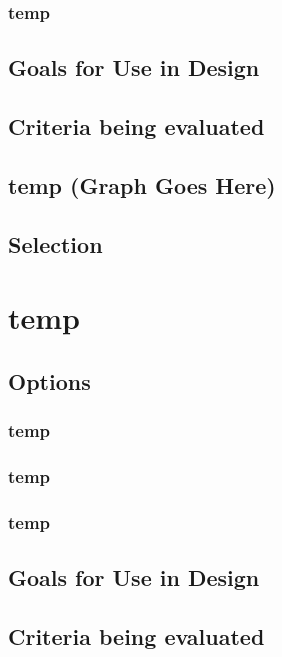 \documentclass[10pt,letterpaper,onecolumn,journal]{IEEEtran}
\begin{document}
\subsubsection{temp}

\subsection{Goals for Use in Design}

\subsection{Criteria being evaluated}

\subsection*{temp (Graph Goes Here)}

\subsection{Selection}

\section{temp}

\subsection{Options}
\subsubsection{temp}

\subsubsection{temp}

\subsubsection{temp}

\subsection{Goals for Use in Design}

\subsection{Criteria being evaluated}
\end{document}
